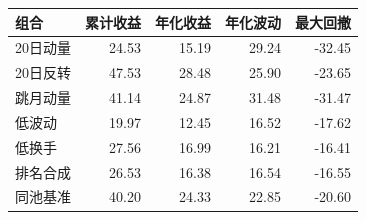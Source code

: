 \begin{tabular}{lrrrr}
\toprule
组合 & 累计收益 & 年化收益 & 年化波动 & 最大回撤\\
\midrule
20日动量 & 24.53 & 15.19 & 29.24 & -32.45\\
20日反转 & 47.53 & 28.48 & 25.90 & -23.65\\
跳月动量 & 41.14 & 24.87 & 31.48 & -31.47\\
低波动 & 19.97 & 12.45 & 16.52 & -17.62\\
低换手 & 27.56 & 16.99 & 16.21 & -16.41\\
排名合成 & 26.53 & 16.38 & 16.54 & -16.55\\
同池基准 & 40.20 & 24.33 & 22.85 & -20.60\\
\bottomrule
\end{tabular}
